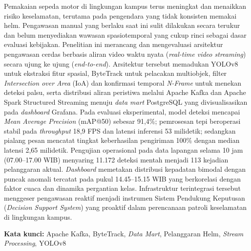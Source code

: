 \begin{abstractind}
  \justifying
  Pemakaian sepeda motor di lingkungan kampus terus meningkat dan menaikkan risiko keselamatan, terutama pada pengendara yang tidak konsisten memakai helm. Pengawasan manual yang berlaku saat ini sulit dilakukan secara terukur dan belum menyediakan wawasan spasiotemporal yang cukup rinci sebagai dasar evaluasi kebijakan. Penelitian ini merancang dan mengevaluasi arsitektur pengawasan cerdas berbasis aliran video waktu nyata (\textit{real-time video streaming}) secara ujung ke ujung (\textit{end-to-end}). Arsitektur tersebut memadukan YOLOv8 untuk ekstraksi fitur spasial, ByteTrack untuk pelacakan multiobjek, filter \textit{Intersection over Area} (IoA) dan konfirmasi temporal \textit{N-Frame} untuk menekan deteksi palsu, serta distribusi aliran peristiwa melalui Apache Kafka dan Apache Spark Structured Streaming menuju \textit{data mart} PostgreSQL yang divisualisasikan pada \textit{dashboard} Grafana. Pada evaluasi eksperimental, model deteksi mencapai \textit{Mean Average Precision} (mAP@50) sebesar 91,4\%; pemrosesan tepi beroperasi stabil pada \textit{throughput} 18,9 FPS dan latensi inferensi 53 milidetik; sedangkan pialang pesan mencatat tingkat keberhasilan pengiriman 100\% dengan median latensi 2,65 milidetik. Pengujian operasional pada data lapangan selama 10 jam (07.00--17.00 WIB) menyaring 11.172 deteksi mentah menjadi 113 kejadian pelanggaran aktual. \textit{Dashboard} memetakan distribusi kepadatan bimodal dengan puncak anomali tercatat pada pukul 14.45--15.15 WIB yang berkorelasi dengan faktor cuaca dan dinamika pergantian kelas. Infrastruktur terintegrasi tersebut menggeser pengawasan reaktif menjadi instrumen Sistem Pendukung Keputusan (\textit{Decision Support System}) yang proaktif dalam perencanaan patroli keselamatan di lingkungan kampus.

\noindent
\textbf{Kata kunci:} Apache Kafka, ByteTrack, \textit{Data Mart}, Pelanggaran Helm, \textit{Stream Processing}, YOLOv8
\end{abstractind}
